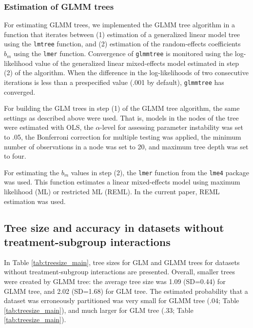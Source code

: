 \documentclass[nobf,doc]{apa}
\begin{document}
\subsubsection{Estimation of GLMM trees}  

For estimating GLMM trees, we implemented the GLMM tree algorithm in a function that iterates between (1) estimation of a generalized linear model tree using the \verb|lmtree| function, and (2) estimation of the random-effects coefficients $b_m$ using the \verb|lmer| function. Convergence of \verb|glmmtree| is monitored using the log-likelihood value of the generalized linear mixed-effects model estimated in step (2) of the algorithm. When the difference in the log-likelihoods of two consecutive iterations is less than a prespecified value (.001 by default), \verb|glmmtree| has converged. 

For building the GLM trees in step (1) of the GLMM tree algorithm, the same settings as described above were used. That is, models in the nodes of the tree were estimated with OLS, the $\alpha$-level for assessing parameter instability was set to .05, the Bonferroni correction for multiple testing was applied, the minimum number of observations in a node was set to 20, and maximum tree depth was set to four.

For estimating the $b_m$ values in step (2), the \verb|lmer| function from the \verb|lme4| package was used. This function estimates a linear mixed-effects model using maximum likelihood (ML) or restricted ML (REML). In the current paper, REML estimation was used.





\subsection{Tree size and accuracy in datasets without treatment-subgroup interactions}

In Table \ref{tab:treesize_main}, tree sizes for GLM and GLMM trees for datasets without treatment-subgroup interactions are presented. Overall, smaller trees were created by GLMM tree: the average tree size was 1.09 (SD=0.44) for GLMM tree, and 2.02 (SD=1.68) for GLM tree. The estimated probability that a dataset was erroneously partitioned was very small for GLMM tree (.04; Table \ref{tab:treesize_main}), and much larger for GLM tree (.33; Table \ref{tab:treesize_main}). 
\end{document}
